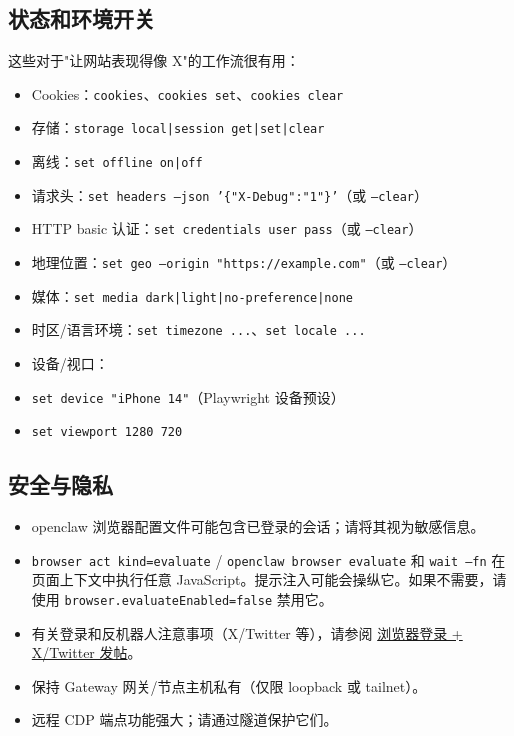 \subsection{状态和环境开关}


这些对于"让网站表现得像 X"的工作流很有用：

\begin{itemize}
  \item Cookies：\texttt{cookies}、\texttt{cookies set}、\texttt{cookies clear}
  \item 存储：\texttt{storage local|session get|set|clear}
  \item 离线：\texttt{set offline on|off}
  \item 请求头：\texttt{set headers --json '\{"X-Debug":"1"\}'}（或 \texttt{--clear}）
  \item HTTP basic 认证：\texttt{set credentials user pass}（或 \texttt{--clear}）
  \item 地理位置：\texttt{set geo   --origin "https://example.com"}（或 \texttt{--clear}）
  \item 媒体：\texttt{set media dark|light|no-preference|none}
  \item 时区/语言环境：\texttt{set timezone ...}、\texttt{set locale ...}
  \item 设备/视口：
  \item \texttt{set device "iPhone 14"}（Playwright 设备预设）
  \item \texttt{set viewport 1280 720}
\end{itemize}


\subsection{安全与隐私}


\begin{itemize}
  \item openclaw 浏览器配置文件可能包含已登录的会话；请将其视为敏感信息。
  \item \texttt{browser act kind=evaluate} / \texttt{openclaw browser evaluate} 和 \texttt{wait --fn} 在页面上下文中执行任意 JavaScript。提示注入可能会操纵它。如果不需要，请使用 \texttt{browser.evaluateEnabled=false} 禁用它。
  \item 有关登录和反机器人注意事项（X/Twitter 等），请参阅 \href{/tools/browser-login}{浏览器登录 + X/Twitter 发帖}。
  \item 保持 Gateway 网关/节点主机私有（仅限 loopback 或 tailnet）。
  \item 远程 CDP 端点功能强大；请通过隧道保护它们。
\end{itemize}


